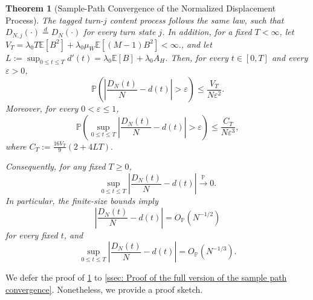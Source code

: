 \documentclass{article}
\newtheorem{theorem}{Theorem}[section]
\theoremstyle{definition}
\newcommand{\E}{\mathbb E}
\newcommand{\pro}{\mathbb P}
\begin{document}
\begin{theorem}[Sample-Path Convergence of the Normalized Displacement Process]
\label{thm: Displacement Process Convergence}
    The tagged turn-$j$ content process follows the same law, such that $D_{N,j}(\cdot)\overset{d}{=}D_N(\cdot)$ for every turn state $j$. In addition, for a fixed $T<\infty$, let $V_T  = \lambda_0T\E[B^2]+\lambda_0\mu_W\E[(M-1)B^2]<\infty.$, and let $L :=\sup_{0\leq t\leq T}d'(t)=\lambda_0\E[B]+\lambda_0A_H$.
    Then, for every $t\in[0,T]$ and every $\varepsilon>0$,
    \begin{equation}
    \label{equ: displacement pointwise concentration}
        \pro\left(\left|\frac{D_N(t)}{N}-d(t)\right|>\varepsilon\right)\leq\frac{V_T}{N\varepsilon^2}.
    \end{equation}
    Moreover, for every $0<\varepsilon\leq1$,
    \begin{equation}
    \label{equ: displacement sample path concentration}
        \pro\left(\sup_{0\leq t\leq T}\left|\frac{D_N(t)}{N}-d(t)\right|>\varepsilon\right)\leq\frac{C_T}{N\varepsilon^3},
    \end{equation}
    where $C_T:=\frac{16V_T}{9}(2+4 L T).$
    
    Consequently, for any fixed $T\geq 0$,
    \begin{equation}
    \label{equ: displacement sample path convergence}
        \sup_{0\leq t\leq T}\left|\frac{D_N(t)}{N}-d(t)\right|\xrightarrow{\mathbb P}0.
    \end{equation}
    In particular, the finite-size bounds imply
    \begin{equation}
    \label{equ: displacement pointwise rate}
        \left|\frac{D_N(t)}{N}-d(t)\right|=O_{\mathbb P}(N^{-1/2})
    \end{equation}
    for every fixed $t$, and
    \begin{equation}
    \label{equ: displacement uniform rate}
        \sup_{0\leq t\leq T}\left|\frac{D_N(t)}{N}-d(t)\right|=O_{\mathbb P}(N^{-1/3}).
    \end{equation}
\end{theorem}

We defer the proof of \cref{thm: Displacement Process Convergence} to \cref{ssec: Proof of the full version of the sample path convergence}. Nonetheless, we provide a proof sketch.
\end{document}
